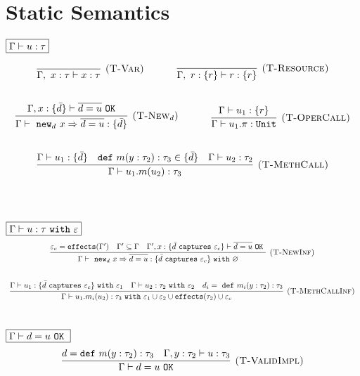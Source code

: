 \documentclass{llncs}
\newcommand{\keywadj}[1]{\mathtt{#1}}
\newcommand{\keyw}[1]{\keywadj{#1}~}
\newcommand{\kw}[1]{\keyw{ #1 }}
\newcommand{\newd}[0]{
	\keywadj{new}_d~x \Rightarrow \overline{d = u}
}
\begin{document}
\section{Static Semantics}

\noindent
$\fbox{$\Gamma \vdash u : \tau$}$

\[
\begin{array}{c}
\infer[\textsc{(T-Var)}]
	{\Gamma,~x : \tau \vdash x : \tau}
	{}
~~~~~~~~~~
\infer[\textsc{(T-Resource)}]
	{\Gamma,~r : \{ r \} \vdash r : \{ r \}}
	{} \\[5ex]

\infer[\textsc{(T-New$_d$)}]
	{\Gamma \vdash~\newd : \{ \bar d \}}
	{\Gamma, x : \{ \bar d \} \vdash \overline{d = u}~\keywadj{OK}}
~~~~~~~~~~
\infer[\textsc{(T-OperCall)}]
	{\Gamma \vdash u_1.\pi : \keywadj{Unit}}
	{\Gamma \vdash u_1 : \{ r \}} \\[5ex]

\infer[\textsc{(T-MethCall)}]
	{\Gamma \vdash u_1.m(u_2) : \tau_3}
	{\Gamma \vdash u_1 : \{ \bar d\} & \keyw{def} m(y : \tau_2) : \tau_3 \in \{ \bar d \} &  \Gamma \vdash u_2 : \tau_2 }\\[5ex]
~~~~~~~~~~

\end{array}
\]

\noindent
$\fbox{$\Gamma \vdash u : \tau~\kw{with} \varepsilon$}$
\[
\begin{array}{c}
\infer[\textsc{(T-NewInf)}]
	{\Gamma \vdash~\newd : \{  \bar d~\keyw{captures} \varepsilon_c \} ~\keyw{with} \varnothing }
	{\varepsilon_c = \keywadj{effects}(\Gamma') & \Gamma' \subseteq \Gamma & \Gamma', x : \{ \bar d~\keyw {captures} \varepsilon_c \} \vdash \overline{d = u}~\keyw{OK}}
	{}
	\\[5ex]
	
	\infer[\textsc{(T-MethCallInf)}]
	{\Gamma \vdash u_1.m_i(u_2) : \tau_3~ \keyw{with} \varepsilon_1 \cup \varepsilon_2 \cup \keywadj{effects}(\tau_2) \cup \varepsilon_c}
	{\Gamma \vdash u_1 : \{ \bar d~\keyw{captures} \varepsilon_c \}~\keyw{with} \varepsilon_1 & \Gamma \vdash u_2:\tau_2~\keyw{with} \varepsilon_2&d_i =~\keyw{def} m_i(y:\tau_2):\tau_3 }
	\\[5ex]
\end{array}
\]

\noindent
$\fbox{$\Gamma \vdash d = u~\keyw{OK}$}$
\[
\begin{array}{c}
\infer[\textsc{(T-ValidImpl)}]
	{\Gamma \vdash d = u~\keywadj{OK}}
	{d = \keyw{def} m(y : \tau_2) : \tau_3 & \Gamma, y : \tau_2 \vdash u : \tau_3}
	\\[5ex]
\end{array}
\]
\end{document}
